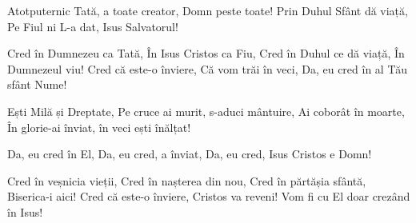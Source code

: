 
\beginverse
Atotputernic Tată, a toate creator,
Domn peste toate!
Prin Duhul Sfânt dă viață,
Pe Fiul ni L-a dat, Isus Salvatorul!
\endverse

\beginchorus
Cred în Dumnezeu ca Tată,
În Isus Cristos ca Fiu,
Cred în Duhul ce dă viață,
În Dumnezeul viu!
Cred că este-o înviere,
Că vom trăi în veci,
Da, eu cred în al Tău sfânt Nume!
\endchorus

\beginverse
Ești Milă și Dreptate,
Pe cruce ai murit, s-aduci mântuire,
Ai coborât în moarte,
În glorie-ai înviat, în veci ești înălțat!
\endverse

\beginverse
Da, eu cred în El,
Da, eu cred, a înviat,
Da, eu cred, Isus Cristos e Domn!
\endverse

\beginchorus
Cred în veșnicia vieții,
Cred în nașterea din nou,
Cred în părtășia sfântă,
Biserica-i aici!
Cred că este-o înviere,
Cristos va reveni!
Vom fi cu El doar crezând în Isus!
\endchorus

\endsong